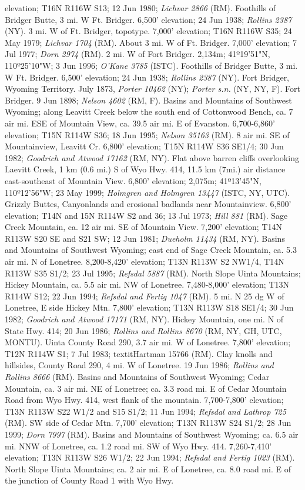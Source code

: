 elevation; T16N R116W S13; 12 Jun 1980; \textit{Lichvar 2866} (RM).  Foothills of Bridger Butte, 3 mi. W Ft. Bridger. 6,500’ elevation; 24 Jun 1938; \textit{Rollins 2387} (NY). 3 mi. W of Ft. Bridger, topotype.	7,000' elevation; T16N R116W S35; 24 May 1979; \textit{Lichvar 1704} (RM).  About 3 mi. W of Ft. Bridger. 7,000' elevation;	7 Jul 1977; \textit{Dorn 2974} (RM).  2 mi. W of Fort Bridger. 2,134m; 41º19'51"N, 110º25'10"W; 3 Jun 1996; \textit{O'Kane 3785} (ISTC).  Foothills of Bridger Butte, 3 mi. W Ft. Bridger. 6,500' elevation; 24 Jun 1938; \textit{Rollins 2387} (NY).  Fort Bridger, Wyoming Territory. July 1873, \textit{Porter 10462} (NY); \textit{Porter s.n.} (NY, NY, F).  Fort Bridger. 9 Jun 1898; \textit{Nelson 4602} (RM, F).  Basins and Mountains of Southwest Wyoming; along Leavitt Creek below the south end of Cottonwood Bench, ca. 7 air mi. ESE of Mountain View, ca. 39.5 air mi. E of Evanston.	6,700-6,860' elevation; T15N R114W S36; 18 Jun 1995; \textit{Nelson 35163} (RM).  8 air mi. SE of Mountainview, Leavitt Cr. 6,800' elevation; T15N R114W S36 SE1/4; 30 Jun 1982; \textit{Goodrich and Atwood 17162} (RM, NY).  Flat above barren cliffs overlooking Laevitt Creek, 1 km (0.6 mi.) S of Wyo Hwy. 414, 11.5 km (7mi.) air distance east-southeast of Mountain View. 6,800' elevation; 2,075m; 41º13'45"N, 110º12'56"W; 23 May 1999; \textit{Holmgren and Holmgren 13447} (ISTC, NY, UTC).  Grizzly Buttes, Canyonlands and erosional badlands near Mountainview. 6,800' elevation;	T14N and 15N R114W S2 and 36; 13 Jul 1973; \textit{Hill 881} (RM).  Sage Creek Mountain, ca. 12 air mi. SE of Mountain View. 7,200' elevation; T14N R113W S20 SE and S21 SW; 12 Jun 1981; \textit{Dueholm 11434} (RM, NY).  Basins and Mountains of Southwest Wyoming; east end of Sage Creek Mountain, ca. 5.3 air mi. N of Lonetree. 8,200-8,420' elevation; T13N R113W S2 NW1/4, T14N R113W S35 S1/2; 23 Jul 1995; \textit{Refsdal 5887} (RM).  North Slope Uinta Mountains; Hickey Mountain, ca. 5.5 air mi. NW of Lonetree. 7,480-8,000' elevation; T13N R114W S12; 22 Jun 1994; \textit{Refsdal and Fertig 1047} (RM).  5 mi. N 25 dg W of Lonetree, E side Hickey Mtn. 7,800' elevation; T13N R113W S18 SE1/4; 30 Jun 1982; \textit{Goodrich and Atwood 17171} (RM, NY).  Hickey Mountain, one mi. N of State Hwy. 414; 20 Jun 1986; \textit{Rollins and Rollins 8670} (RM, NY, GH, UTC, MONTU).  Uinta County Road 290, 3.7 air mi. W of Lonetree. 7,800' elevation; T12N R114W S1; 7 Jul 1983; textit{Hartman 15766} (RM).  Clay knolls and hillsides, County Road 290, 4 mi. W of Lonetree. 19 Jun 1986; \textit{Rollins and Rollins 8666} (RM).  Basins and Mountains of Southwest Wyoming; Cedar Mountain, ca. 3 air mi. NE of Lonetree; ca. 3.3 road mi. E of Cedar Mountain Road from Wyo Hwy. 414, west flank of the mountain. 7,700-7,800' elevation; T13N R113W S22 W1/2 and S15 S1/2; 11 Jun 1994; \textit{Refsdal and Lathrop 725} (RM).  SW side of Cedar Mtn. 7,700' elevation; T13N R113W S24 S1/2; 28 Jun 1999; \textit{Dorn 7997} (RM).  Basins and Mountains of Southwest Wyoming; ca. 6.5 air mi. NNW of Lonetree, ca. 1.2 road mi. SW of Wyo Hwy. 414. 7,260-7,410' elevation; T13N R113W S26 W1/2; 22 Jun 1994; \textit{Refsdal and Fertig 1023} (RM).  North Slope Uinta Mountains; ca. 2 air mi. E of Lonetree, ca. 8.0 road mi. E of the junction of County Road 1 with Wyo Hwy. 